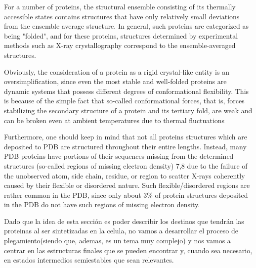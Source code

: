 For a number of proteins, the structural ensemble consisting of its thermally accessible
states contains structures that have only relatively small deviations from the ensemble
average structure. In general, such proteins are categorized as being "folded", and for
these proteins, structures determined by experimental methods such as X-ray crystallography correspond to the ensemble-averaged structures.


Obviously, the consideration of a protein as a rigid crystal-like entity is an oversimplification, since even the most stable and well-folded proteins are dynamic systems that possess different degrees of conformational flexibility.
This is because of the simple fact that so-called conformational forces, that is, forces stabilizing the secondary structure of a protein and its tertiary fold, are weak and can be broken even at ambient temperatures due to thermal fluctuations

Furthermore, one should keep in mind that not all proteins structures which are deposited to PDB are structured throughout their entire lengths. Instead, many PDB proteins
have portions of their sequences missing from the determined structures (so-called regions of missing electron density) 7,8 due to the failure of the unobserved atom, side chain, residue, or region to scatter
X-rays coherently caused by their flexible or disordered nature. Such flexible/disordered regions are rather common in the PDB, since only about 3\% of
protein structures deposited in the PDB do not have such regions of missing electron density.


  
Dado que la idea de esta sección es poder describir los destinos que tendrán las proteinas al ser sintetizadas en la celula, 
no vamos a desarrollar el proceso de plegamiento(siendo que, ademas, es un tema muy complejo) y nos vamos a centrar en las estructuras finales que se pueden encontrar y, cuando sea necesario, en estados intermedios semiestables que sean relevantes.

